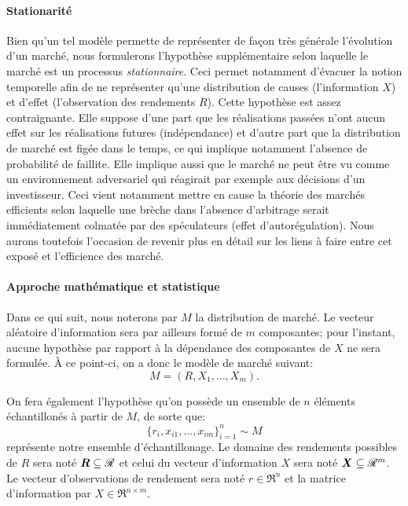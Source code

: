 \paragraph{Stationarité}

Bien qu'un tel modèle permette de représenter de façon très générale l'évolution d'un
marché, nous formulerons l'hypothèse supplémentaire selon laquelle le marché est un
processus \textit{stationnaire}. Ceci permet notamment d'évacuer la notion temporelle afin
de ne représenter qu'une distribution de causes (l'information $X$) et d'effet
(l'observation des rendements $R$). Cette hypothèse est assez contraignante. Elle suppose
d'une part que les réalisations passées n'ont aucun effet sur les réalisations futures
(indépendance) et d'autre part que la distribution de marché est figée dans le temps, ce
qui implique notamment l'absence de probabilité de faillite. Elle implique aussi que le
marché ne peut être vu comme un environnement adversariel qui réagirait par exemple aux
décisions d'un investisseur. Ceci vient notamment mettre en cause la théorie des marchés
efficients selon laquelle une brèche dans l'absence d'arbitrage serait immédiatement
colmatée par des spéculateurs (effet d'autorégulation). Nous aurons toutefois l'occasion
de revenir plus en détail sur les liens à faire entre cet exposé et l'efficience des
marché.

\paragraph{Approche mathématique et statistique}

Dans ce qui suit, nous noterons par $M$ la distribution de marché. Le vecteur aléatoire
d'information sera par ailleurs formé de $m$ composantes; pour l'instant, aucune hypothèse
par rapport à la dépendance des composantes de $X$ ne sera formulée. À ce point-ci, on a
donc le modèle de marché suivant:
\begin{equation}
  M = (R,X_1, \ldots, X_m).
\end{equation}

On fera également l'hypothèse qu'on possède un ensemble de $n$ éléments échantillonés à
partir de $M$, de sorte que:
\begin{equation}
  \{r_i, x_{i1}, \ldots, x_{im}\}_{i=1}^n \sim M
\end{equation}
représente notre ensemble d'échantillonage. Le domaine des rendements possibles de $R$
sera noté $\bm{R} \subseteq \mathscr{R}$ et celui du vecteur d'information $X$ sera noté
$\bm{X} \subseteq \mathscr{R}^m$. Le vecteur d'observations de rendement sera noté $r \in \Re^n$ et la matrice
d'information par $X \in \Re^{n \times m}$.



